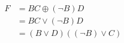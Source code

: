 \documentclass[border=2pt]{standalone}
\begin{document}
\Large
\(\begin{aligned}
F &= BC \oplus (\neg B)D \\
  &= BC \lor (\neg B)D \\
  &= (B \lor D)((\neg B) \lor C)
\end{aligned}\)
\end{document}
